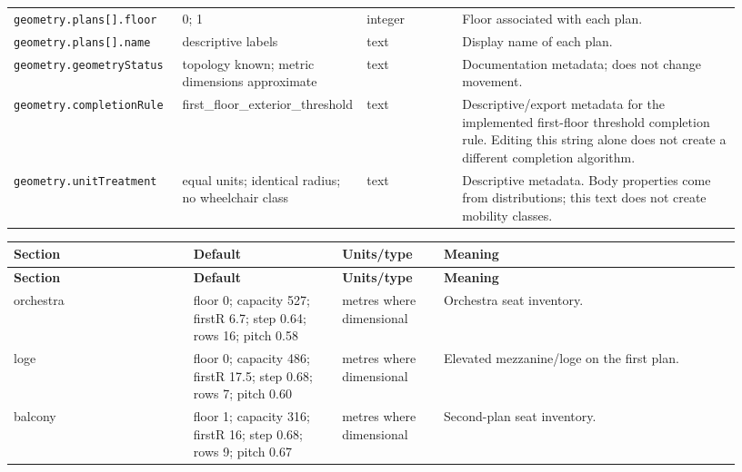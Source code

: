 \documentclass[11pt]{article}
\begin{document}
{\begin{longtable}{@{}p{0.23\linewidth}p{0.19\linewidth}p{0.13\linewidth}p{0.38\linewidth}@{}}
\texttt{geometry.\allowbreak{}plans[].\allowbreak{}floor} & 0; 1 & integer & Floor associated with each plan. \\

\texttt{geometry.\allowbreak{}plans[].\allowbreak{}name} & descriptive labels & text & Display name of each plan. \\

\texttt{geometry.\allowbreak{}geometry\allowbreak{}Status} & topology known; metric dimensions approximate & text & Documentation metadata; does not change movement. \\

\texttt{geometry.\allowbreak{}completion\allowbreak{}Rule} & first\_floor\_exterior\_threshold & text & Descriptive/export metadata for the implemented first-floor threshold completion rule. Editing this string alone does not create a different completion algorithm. \\

\texttt{geometry.\allowbreak{}unit\allowbreak{}Treatment} & equal units; identical radius; no wheelchair class & text & Descriptive metadata. Body properties come from distributions; this text does not create mobility classes. \\

\end{longtable}

}

{\small\setlength{\tabcolsep}{4pt}

\begin{longtable}{@{}p{0.23\linewidth}p{0.19\linewidth}p{0.13\linewidth}p{0.38\linewidth}@{}}

\toprule

\textbf{Section} & \textbf{Default} & \textbf{Units/type} & \textbf{Meaning} \\

\midrule\endfirsthead

\toprule

\textbf{Section} & \textbf{Default} & \textbf{Units/type} & \textbf{Meaning} \\

\midrule\endhead

\bottomrule\endfoot

orchestra & floor 0; capacity 527; firstR 6.7; step 0.64; rows 16; pitch 0.58 & metres where dimensional & Orchestra seat inventory. \\

loge & floor 0; capacity 486; firstR 17.5; step 0.68; rows 7; pitch 0.60 & metres where dimensional & Elevated mezzanine/loge on the first plan. \\

balcony & floor 1; capacity 316; firstR 16; step 0.68; rows 9; pitch 0.67 & metres where dimensional & Second-plan seat inventory. \\

\end{longtable}

}
\end{document}
